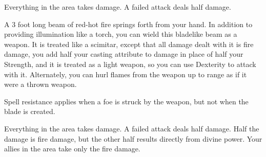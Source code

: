 \spellrng{\rngmed}
\begin{spelleffect}
    Everything in the area takes damage. A failed attack deals half damage.
\end{spelleffect}
\begin{spellnotes}
    \destructivespellnotes

    \firespellnotes
\end{spellnotes}

\begin{spelleffect}
  A 3 foot long beam of red-hot fire springs forth from your hand. In addition to providing illumination like a torch, you can wield this bladelike beam as a weapon. It is treated like a scimitar, except that all damage dealt with it is fire damage, you add half your casting attribute to damage in place of half your Strength, and it is treated as a light weapon, so you can use Dexterity to attack with it. Alternately, you can hurl flames from the weapon up to \rngmed range as if it were a thrown weapon.
\end{spelleffect}
\begin{spellnotes}
    \firespellnotes

    Spell resistance applies when a foe is struck by the weapon, but not when the blade is created.
\end{spellnotes}

\spellrng{\rngclose}
\begin{spelleffect}
    Everything in the area takes damage. A failed attack deals half damage. Half the damage is fire damage, but the other half results directly from divine power. Your allies in the area take only the fire damage.
\end{spelleffect}
\begin{spellnotes}
    \destructivespellnotes

    \firespellnotes
\end{spellnotes}

